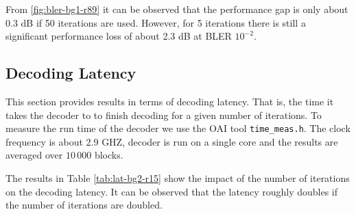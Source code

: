 \documentclass{article}
\begin{document}
From \ref{fig:bler-bg1-r89} it can be observed that the performance gap is only about 0.3 dB if 50 iterations are used. However, for 5 iterations there is still a significant performance loss of about 2.3 dB at BLER $10^{-2}$.

\newpage
\subsection{Decoding Latency}
\label{sec:decoding-time}

This section provides results in terms of decoding latency. That is, the time it takes the decoder to to finish decoding for a given number of iterations. To measure the run time of the decoder we use the OAI tool \texttt{time\_meas.h}. The clock frequency is about 2.9 GHZ, decoder is run on a single core and the results are averaged over $10\,000$ blocks.

The results in Table \ref{tab:lat-bg2-r15} show the impact of the number of iterations on the decoding latency. It can be observed that the latency roughly doubles if the number of iterations are doubled.
\end{document}
